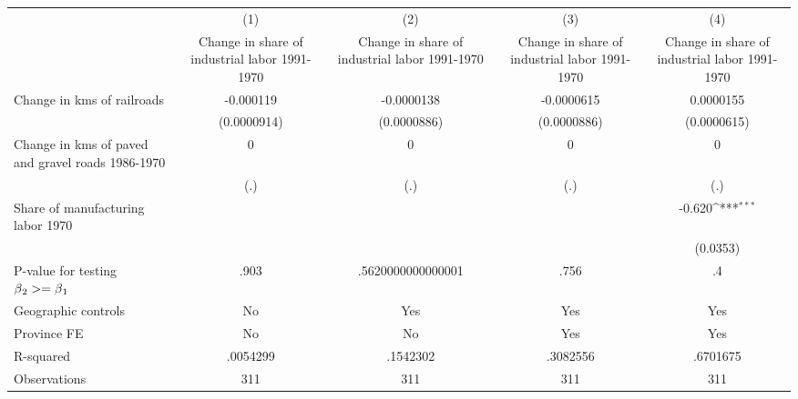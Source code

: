 {
\def\sym#1{\ifmmode^{#1}\else\(^{#1}\)\fi}
\begin{tabular}{l*{4}{c}}
\hline\hline
                &\multicolumn{1}{c}{(1)}&\multicolumn{1}{c}{(2)}&\multicolumn{1}{c}{(3)}&\multicolumn{1}{c}{(4)}\\
                &\multicolumn{1}{c}{Change in share of industrial labor 1991-1970}&\multicolumn{1}{c}{Change in share of industrial labor 1991-1970}&\multicolumn{1}{c}{Change in share of industrial labor 1991-1970}&\multicolumn{1}{c}{Change in share of industrial labor 1991-1970}\\
\hline
Change in kms of railroads&-0.000119         &-0.0000138         &-0.0000615         &0.0000155         \\
                &(0.0000914)         &(0.0000886)         &(0.0000886)         &(0.0000615)         \\
[1em]
Change in kms of paved and gravel roads 1986-1970&        0         &        0         &        0         &        0         \\
                &      (.)         &      (.)         &      (.)         &      (.)         \\
[1em]
Share of manufacturing labor 1970&                  &                  &                  &   -0.620\sym{***}\\
                &                  &                  &                  & (0.0353)         \\
\hline
P-value for testing $\beta\\_2 >= \beta\\_1$&     .903         &.5620000000000001         &     .756         &       .4         \\
Geographic controls&       No         &      Yes         &      Yes         &      Yes         \\
Province FE     &       No         &       No         &      Yes         &      Yes         \\
R-squared       & .0054299         & .1542302         & .3082556         & .6701675         \\
Observations    &      311         &      311         &      311         &      311         \\
\hline\hline
\end{tabular}
}
